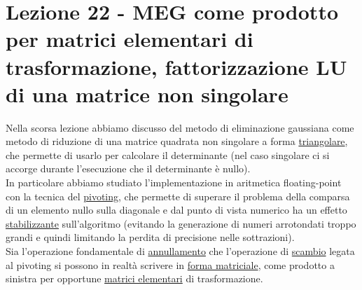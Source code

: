 \section[Lezione 22 - Fattorizzazione LU]{Lezione 22 - MEG come prodotto per matrici elementari di trasformazione, fattorizzazione LU di una matrice non singolare}
Nella scorsa lezione abbiamo discusso del metodo di eliminazione gaussiana come metodo di riduzione di una matrice quadrata non singolare a forma \uline{triangolare}, che permette di usarlo per calcolare il determinante (nel caso singolare ci si accorge durante l'esecuzione che il determinante è nullo).\\In particolare abbiamo studiato l'implementazione in aritmetica floating-point con la tecnica del \uline{pivoting}, che permette di superare il problema della comparsa di un elemento nullo sulla diagonale e dal punto di vista numerico ha un effetto \uline{stabilizzante} sull'algoritmo (evitando la generazione di numeri arrotondati troppo grandi e quindi limitando la perdita di precisione nelle sottrazioni).\\
Sia l'operazione fondamentale di \uline{annullamento} che l'operazione di \uline{scambio} legata al pivoting si possono in realtà scrivere in \uline{forma matriciale}, come prodotto a sinistra per opportune \uline{matrici elementari} di trasformazione.

